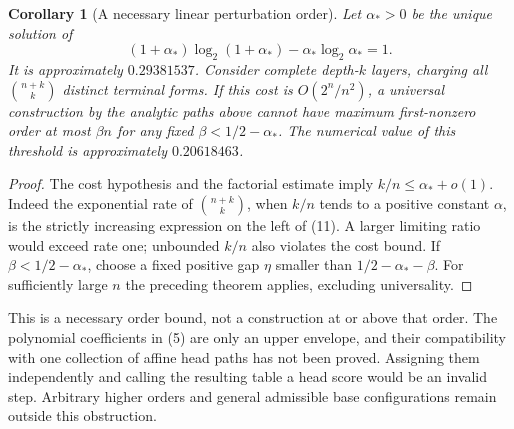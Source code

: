 \documentclass[11pt]{article}
\newtheorem{corollary}[theorem]{Corollary}
\begin{document}
\begin{corollary}[A necessary linear perturbation order]
Let $\alpha_*>0$ be the unique solution of
\[
       (1+\alpha_*)\log_2(1+\alpha_*)
                         -\alpha_*\log_2\alpha_*=1.
 \tag{11}
\]
It is approximately $0.29381537$. Consider complete depth-$k$
layers, charging all $\binom{n+k}{k}$ distinct terminal forms.
If this cost is $O(2^n/n^2)$, a universal construction by the
analytic paths above cannot have maximum first-nonzero order at
most $\beta n$ for any fixed $\beta<1/2-\alpha_*$.
The numerical value of this threshold is approximately $0.20618463$.
\end{corollary}
\begin{proof}
The cost hypothesis and the factorial estimate imply
$k/n\le\alpha_*+o(1)$. Indeed the exponential rate of
$\binom{n+k}{k}$, when $k/n$ tends to a positive constant
$\alpha$, is the strictly increasing expression on the left of
(11). A larger limiting ratio would exceed rate one; unbounded
$k/n$ also violates the cost bound. If $\beta<1/2-\alpha_*$,
choose a fixed positive gap $\eta$ smaller than
$1/2-\alpha_*-\beta$. For sufficiently large $n$ the preceding
theorem applies, excluding universality.
\end{proof}

This is a necessary order bound, not a construction at or above
that order. The polynomial coefficients in (5) are only an upper
envelope, and their compatibility with one collection of affine
head paths has not been proved. Assigning them independently and
calling the resulting table a head score would be an invalid step.
Arbitrary higher orders and general admissible base configurations
remain outside this obstruction.
\end{document}
